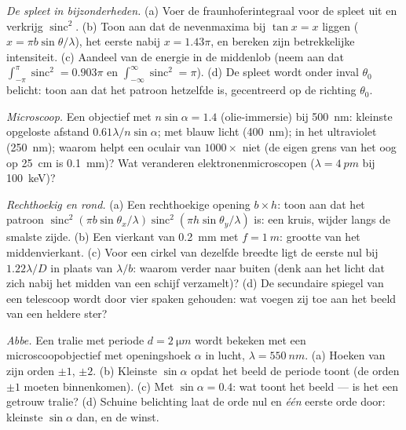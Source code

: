 \begin{exercise}[$\star\star$]\label{exo:b2:diffraction:5}
\emph{De spleet in bijzonderheden.} (a) Voer de fraunhoferintegraal voor
de spleet uit en verkrijg $\operatorname{sinc}^2$. (b) Toon aan dat de nevenmaxima
bij $\tan x = x$ liggen ($x = \pi b\sin\theta/\lambda$), het eerste nabij
$x = 1.43\pi$, en
bereken zijn betrekkelijke intensiteit. (c) Aandeel van de energie in de
middenlob (neem aan dat $\int_{-\pi}^\pi\operatorname{sinc}^2 = 0.903\pi$ en
$\int_{-\infty}^\infty\operatorname{sinc}^2 = \pi$). (d) De spleet wordt onder inval
$\theta_0$ belicht: toon aan dat het patroon hetzelfde is, gecentreerd op de
richting $\theta_0$.
\end{exercise}

\begin{exercise}[$\star\star$]\label{exo:b2:diffraction:6}
\emph{Microscoop.} Een objectief met  $n\sin\alpha = 1.4$
(olie-immersie) bij \qty{500}{nm}: kleinste opgeloste afstand
$0.61\lambda/n\sin
\alpha$; met blauw licht (\qty{400}{nm}); in het
ultraviolet (\qty{250}{nm}); waarom
helpt een oculair van $1000\times$ niet (de eigen grens van het oog op
\qty{25}{cm} is
\qty{0.1}{mm})? Wat veranderen elektronenmicroscopen ($\lambda = \qty{4}{pm}$ bij
\qty{100}{keV})?
\end{exercise}

\begin{exercise}[$\star\star$]\label{exo:b2:diffraction:7}
\emph{Rechthoekig en rond.} (a) Een rechthoekige opening $b \times h$:
toon aan dat het patroon
$\operatorname{sinc}^2(\pi b\sin\theta_x/\lambda)\operatorname{sinc}^2(\pi h
\sin\theta_y/\lambda)$
is: een kruis, wijder langs de smalste zijde. (b) Een vierkant van
\qty{0.2}{mm} met $f = \qty{1}{m}$: grootte van het middenvierkant. (c) Voor een
cirkel van dezelfde breedte ligt de eerste nul bij $1.22\lambda/D$ in plaats
van $\lambda/b$:
waarom verder naar buiten (denk aan het licht dat zich nabij het midden van een
schijf verzamelt)? (d) De secundaire spiegel van een telescoop wordt door
vier spaken gehouden: wat voegen
zij toe aan het beeld van een heldere ster?
\end{exercise}

\begin{exercise}[$\star\star$]\label{exo:b2:diffraction:8}
\emph{Abbe.} Een tralie met periode $d = \qty{2}{\micro m}$ wordt bekeken met een
microscoopobjectief met openingshoek $\alpha$ in lucht, $\lambda = \qty{550}{nm}$.
(a) Hoeken van zijn orden $\pm1$, $\pm2$. (b) Kleinste $\sin\alpha$ opdat het beeld
de periode toont (de orden $\pm1$ moeten binnenkomen). (c) Met
$\sin\alpha = 0.4$: wat
toont het beeld --- is het een getrouw tralie? (d) Schuine
belichting laat de orde nul en \emph{één} eerste orde door:
kleinste $\sin\alpha$ dan, en de winst.
\end{exercise}

